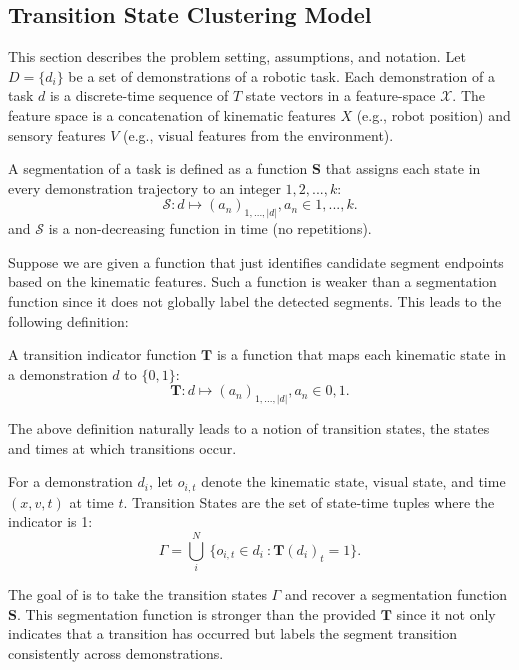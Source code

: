 \subsection{Transition State Clustering Model}
This section describes the problem setting, assumptions, and notation.
Let $D=\{d_i\}$ be a set of demonstrations of a robotic task.
Each demonstration of a task $d$ is a discrete-time sequence of $T$ state vectors in a feature-space $\mathcal{X}$.
The feature space is a concatenation of kinematic features $X$ (e.g., robot position) and sensory features $V$ (e.g., visual features from the environment).

\begin{definition}[Segmentation]
A segmentation of a task is defined as a function $\mathbf{S}$ that assigns each state in every demonstration trajectory to an integer $1,2,...,k$:
\[
\mathcal{S}: d \mapsto (a_n)_{1,...,|d|}, a_n \in {1,...,k}.
\]
and $\mathcal{S}$ is a non-decreasing function in time (no repetitions).
\end{definition}

Suppose we are given a function that just identifies candidate segment endpoints based on the kinematic features.
Such a function is weaker than a segmentation function since it does not globally label the detected segments.
This leads to the following definition:

\begin{definition}
A transition indicator function $\mathbf{T}$ is a function that maps each kinematic state in a demonstration $d$ to $\{0,1\}$:
\[
\mathbf{T}: d \mapsto (a_n)_{1,...,|d|}, a_n \in {0,1}.
\]
\end{definition}

The above definition naturally leads to a notion of transition states, the states and times at which transitions occur.

\begin{definition}
For a demonstration $d_i$, let $o_{i,t}$ denote the kinematic state, visual state, and time $(x,v,t)$ at time $t$.
Transition States are the set of state-time tuples where the indicator is 1:
\[
\Gamma = \bigcup_{i}^N ~\{o_{i,t} \in d_i ~: \mathbf{T}(d_i)_t = 1\}.
\]
\end{definition}

The goal of \tsc is to take the transition states $\Gamma$ and recover a segmentation function $\mathbf{S}$. This segmentation function is stronger than the provided $\mathbf{T}$ since it not only indicates that a transition has occurred but labels the segment transition consistently across demonstrations.

